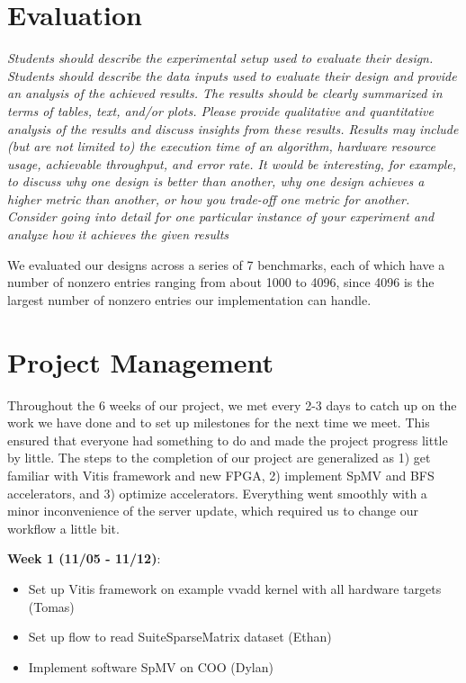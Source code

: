\documentclass[10pt]{article}
\begin{document}
\section{Evaluation}
\textit{Students should describe the experimental setup used to evaluate their design. Students
should describe the data inputs used to evaluate their design and provide an analysis of the achieved
results. The results should be clearly summarized in terms of tables, text, and/or plots. Please provide
qualitative and quantitative analysis of the results and discuss insights from these results. Results may
include (but are not limited to) the execution time of an algorithm, hardware resource usage, achievable
throughput, and error rate. It would be interesting, for example, to discuss why one design is better
than another, why one design achieves a higher metric than another, or how you trade-off one metric
for another. Consider going into detail for one particular instance of your experiment and analyze how
it achieves the given results}

\noindent We evaluated our designs across a series of 7 benchmarks, each of which have a number of nonzero entries ranging
from about 1000 to 4096, since 4096 is the largest number of nonzero entries our implementation can handle. \newline


\section{Project Management}

Throughout the 6 weeks of our project, we met every 2-3 days to catch up on the work we have done and to set up
milestones for the next time we meet. This ensured that everyone had something to do and made the project
progress little by little. The steps to the completion of our project are generalized as 1) get familiar with
Vitis framework and new FPGA, 2) implement SpMV and BFS accelerators, and 3) optimize accelerators. Everything went
smoothly with a minor inconvenience of the server update, which required us to change our workflow a little bit. \newline

\noindent \textbf{Week 1 (11/05 - 11/12)}:
\begin{itemize}
  \item Set up Vitis framework on example vvadd kernel with all hardware targets (Tomas)
  \item Set up flow to read SuiteSparseMatrix dataset (Ethan)
  \item Implement software SpMV on COO (Dylan)
\end{itemize}
\end{document}
